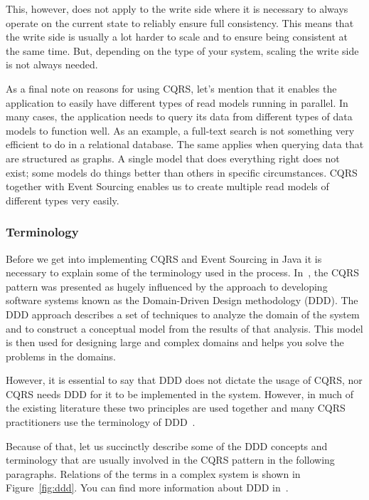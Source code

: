 \documentclass{book}
\begin{document}
This, however, does not apply to the write side where it is necessary to
always operate on the current state to reliably ensure full consistency.
This means that the write side is usually a lot harder to scale and to
ensure being consistent at the same time. But, depending on the type of
your system, scaling the write side is not always needed.

As a final note on reasons for using CQRS, let's mention that it enables
the application to easily have different types of read models running in
parallel. In many cases, the application needs to query its data from
different types of data models to function well. As an example, a
full-text search is not something very efficient to do in a relational
database. The same applies when querying data that are structured as
graphs. A single model that does everything right does not exist; some
models do things better than others in specific circumstances. CQRS
together with Event Sourcing enables us to create multiple read models
of different types very easily.

\subsubsection{Terminology}\label{terminology}

Before we get into implementing CQRS and Event Sourcing in Java it is
necessary to explain some of the terminology used in the process. In~\cite{journey}, the CQRS pattern was presented as hugely influenced by
the approach to developing software systems known as the Domain-Driven
Design methodology (DDD). The DDD approach describes a set of techniques
to analyze the domain of the system and to construct a conceptual model
from the results of that analysis. This model is then used for designing
large and complex domains and helps you solve the problems in the
domains.

However, it is essential to say that DDD does not dictate the usage of
CQRS, nor CQRS needs DDD for it to be implemented in the system.
However, in much of the existing literature these two principles are
used together and many CQRS practitioners use the terminology of DDD~\cite{journey}.

Because of that, let us succinctly describe some of the DDD concepts and
terminology that are usually involved in the CQRS pattern in the
following paragraphs. Relations of the terms in a complex system is
shown in Figure~\ref{fig:ddd}. You can find more information about DDD
in~\cite{ddd}.
\end{document}

